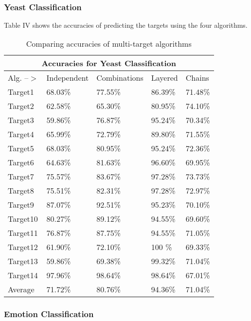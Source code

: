 \documentclass[letterpaper, 11 pt, conference]{IEEEtran}  %
\begin{document}
\subsubsection{Yeast Classification}

Table IV shows the accuracies of predicting the targets using the four algorithms.

\begin{table}[h]
	\caption{Comparing accuracies of multi-target algorithms}
	\centering
\begin{tabular}{ |p{1.2cm}|p{1.5cm}|p{1.7cm}|p{1cm}|p{1.25cm}|}
	\hline
	\multicolumn{5}{|c|}{Accuracies for Yeast Classification} \\
	\hline
	Alg. --$>$& Independent& Combinations  & Layered  & Chains \\
	\hline
	Target1 & 68.03\% & 77.55\% & 86.39\% & 71.48\% \\
	Target2 & 62.58\% & 65.30\% & 80.95\% & 74.10\% \\
	Target3 & 59.86\% & 76.87\% & 95.24\% & 70.34\% \\
	Target4 & 65.99\% & 72.79\% & 89.80\% & 71.55\% \\
	Target5 & 68.03\% & 80.95\% & 95.24\% & 72.36\% \\
	Target6 & 64.63\% & 81.63\% & 96.60\% & 69.95\% \\
	Target7 & 75.57\% & 83.67\% & 97.28\% & 73.73\% \\
	Target8 & 75.51\% & 82.31\% & 97.28\% & 72.97\% \\
	Target9 & 87.07\% & 92.51\% & 95.23\% & 70.10\% \\
	Target10& 80.27\% & 89.12\% & 94.55\% & 69.60\% \\
	Target11& 76.87\% & 87.75\% & 94.55\% & 71.05\% \\
	Target12& 61.90\% & 72.10\% & 100  \% & 69.33\% \\
	Target13& 59.86\% & 69.38\% & 99.32\% & 71.04\% \\
	Target14& 97.96\% & 98.64\% & 98.64\% & 67.01\% \\
	\hline
	Average & 71.72\% & 80.76\% & 94.36\% & 71.04\% \\
	\hline
\end{tabular}
\end{table}

\subsubsection{Emotion Classification}
\end{document}

